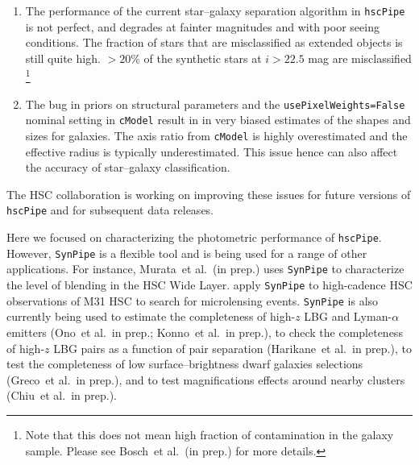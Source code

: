\documentclass[useamsfonts]{pasj01}
\def\etal{{\ et al.~}}
\def\hscpipe{\texttt{hscPipe}}
\def\synpipe{\texttt{SynPipe}}
\def\cmodel{\texttt{cModel}}
\begin{document}
    \begin{enumerate}

        \item The performance of the current star--galaxy separation algorithm in 
            \hscpipe{} is not perfect, and degrades at fainter magnitudes and with 
            poor seeing conditions.
            The fraction of stars that are misclassified as extended objects is still
            quite high. 
            $>20$\% of the synthetic stars at $i> 22.5$ mag are misclassified
            \footnote{Note that this does not mean high fraction of contamination 
            in the galaxy sample. Please see Bosch\etal (in prep.) for more 
            details.}

        \item The bug in priors on structural parameters and the 
            \texttt{usePixelWeights=False} nominal setting in \cmodel{} result in         
            in very biased estimates of the shapes and sizes for galaxies. 
            The axis ratio from \cmodel{} is highly overestimated and the effective 
            radius is typically underestimated.  
            This issue hence can also affect the accuracy of star--galaxy 
            classification.

    \end{enumerate}

    The HSC collaboration is working on improving these issues for future versions
    of \hscpipe{} and for subsequent data releases.  
    

    Here we focused on characterizing the photometric performance of \hscpipe{}.  
    However, \synpipe{} is a flexible tool and is being used for a range of other     
    applications. 
    For instance, Murata\etal (in prep.) uses \synpipe{} to characterize the level of
    blending in the HSC Wide Layer.  
    \citep{Niikura2017} apply \synpipe{} to high-cadence HSC observations of M31 HSC 
    to search for microlensing events. 
    \synpipe{} is also currently being used to estimate the completeness of high-$z$ 
    LBG and Lyman-$\alpha$ emitters (Ono\etal in prep.; Konno\etal in prep.), to 
    check the completeness of high-$z$ LBG pairs as a function of pair separation 
    (Harikane\etal in prep.), to test the completeness of low surface--brightness 
    dwarf galaxies selections (Greco\etal in prep.), and to test magnifications effects
    around nearby clusters (Chiu\etal in prep.).
\end{document}
